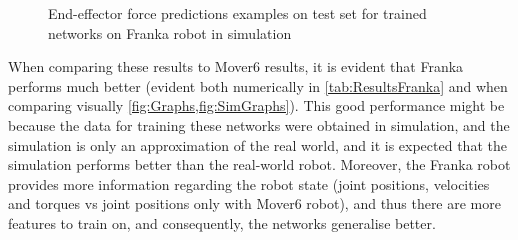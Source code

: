 \begin{figure}
{    }
    \vfill
    \hfill
    \caption{End-effector force predictions examples on test set for trained networks on Franka robot in simulation}
    \label{fig:SimGraphs}
\end{figure}

When comparing these results to Mover6 results, it is evident that Franka performs much better (evident both numerically in \cref{tab:ResultsFranka} and when comparing visually \cref{fig:Graphs,fig:SimGraphs}). This good performance might be because the data for training these networks were obtained in simulation, and the simulation is only an approximation of the real world, and it is expected that the simulation performs better than the real-world robot. Moreover, the Franka robot provides more information regarding the robot state (joint positions, velocities and torques vs joint positions only with Mover6 robot), and thus there are more features to train on, and consequently, the networks generalise better.

